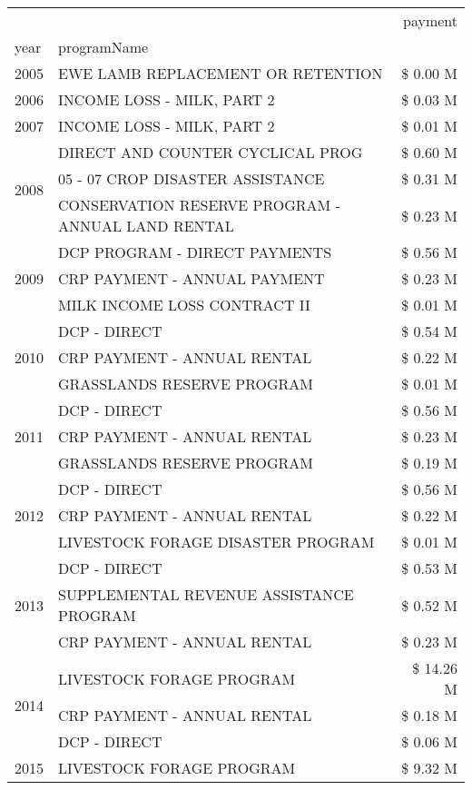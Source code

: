 \begin{tabular}{llr}
\toprule
 &  & payment \\
year & programName &  \\
\midrule
2005 & EWE LAMB REPLACEMENT OR RETENTION & \$ 0.00 M \\
\cline{1-3}
2006 & INCOME LOSS - MILK, PART 2 & \$ 0.03 M \\
\cline{1-3}
2007 & INCOME LOSS - MILK, PART 2 & \$ 0.01 M \\
\cline{1-3}
\multirow[t]{3}{*}{2008} & DIRECT AND COUNTER CYCLICAL PROG & \$ 0.60 M \\
 & 05 - 07 CROP DISASTER ASSISTANCE & \$ 0.31 M \\
 & CONSERVATION RESERVE PROGRAM - ANNUAL LAND RENTAL & \$ 0.23 M \\
\cline{1-3}
\multirow[t]{3}{*}{2009} & DCP PROGRAM - DIRECT PAYMENTS & \$ 0.56 M \\
 & CRP PAYMENT - ANNUAL PAYMENT & \$ 0.23 M \\
 & MILK INCOME LOSS CONTRACT II & \$ 0.01 M \\
\cline{1-3}
\multirow[t]{3}{*}{2010} & DCP - DIRECT & \$ 0.54 M \\
 & CRP PAYMENT - ANNUAL RENTAL & \$ 0.22 M \\
 & GRASSLANDS RESERVE PROGRAM & \$ 0.01 M \\
\cline{1-3}
\multirow[t]{3}{*}{2011} & DCP - DIRECT & \$ 0.56 M \\
 & CRP PAYMENT - ANNUAL RENTAL & \$ 0.23 M \\
 & GRASSLANDS RESERVE PROGRAM & \$ 0.19 M \\
\cline{1-3}
\multirow[t]{3}{*}{2012} & DCP - DIRECT & \$ 0.56 M \\
 & CRP PAYMENT - ANNUAL RENTAL & \$ 0.22 M \\
 & LIVESTOCK FORAGE DISASTER PROGRAM & \$ 0.01 M \\
\cline{1-3}
\multirow[t]{3}{*}{2013} & DCP - DIRECT & \$ 0.53 M \\
 & SUPPLEMENTAL REVENUE ASSISTANCE PROGRAM & \$ 0.52 M \\
 & CRP PAYMENT - ANNUAL RENTAL & \$ 0.23 M \\
\cline{1-3}
\multirow[t]{3}{*}{2014} & LIVESTOCK FORAGE PROGRAM & \$ 14.26 M \\
 & CRP PAYMENT - ANNUAL RENTAL & \$ 0.18 M \\
 & DCP - DIRECT & \$ 0.06 M \\
\cline{1-3}
\multirow[t]{3}{*}{2015} & LIVESTOCK FORAGE PROGRAM & \$ 9.32 M \\

\end{tabular}

